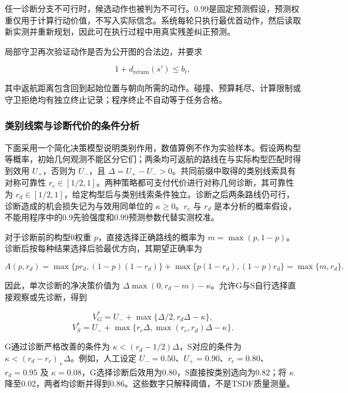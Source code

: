 \documentclass[11pt,a4paper]{article}
\numberwithin{equation}{section}
\begin{document}
任一诊断分支不可行时，候选动作也被判为不可行。0.99是固定预测假设，预测权重仅用于计算行动价值，不写入实际信念。系统每轮只执行最优首动作，然后读取新实测并重新规划，因此可在执行过程中用真实残差纠正预测。

局部守卫再次验证动作是否为公开图的合法边，并要求

\begin{equation}
1+d_{\mathrm{return}}(s')\le b_t,
\end{equation}

其中返航距离包含回到起始位置与朝向所需的动作。碰撞、预算耗尽、计算限制或守卫拒绝均有独立终止记录；程序终止不自动等于任务合格。

\hypertarget{ux7c7bux522bux7ebfux7d22ux4e0eux8bcaux65adux4ee3ux4ef7ux7684ux6761ux4ef6ux5206ux6790}{%
\subsubsection{类别线索与诊断代价的条件分析}\label{ux7c7bux522bux7ebfux7d22ux4e0eux8bcaux65adux4ee3ux4ef7ux7684ux6761ux4ef6ux5206ux6790}}

下面采用一个简化决策模型说明类别作用，数值算例不作为实验样本。假设两构型等概率，初始几何观测不能区分它们；两条均可返航的路线在与实际构型匹配时得到效用 \(U_+\)，否则为 \(U_-\)，且 \(\Delta=U_+-U_->0\)。共同前缀中取得的类别线索具有对称可靠性 \(r_c\in[1/2,1]\)。两种策略都可支付代价进行对称几何诊断，其可靠性为 \(r_d\in[1/2,1]\)，给定构型后与类别线索条件独立。诊断之后两条路线仍可行，诊断造成的机会损失记为与效用同单位的 \(\kappa\ge0\)。\(r_c\) 与 \(r_d\) 是本分析的概率假设，不能用程序中的0.9先验强度和0.99预测参数代替实测校准。

对于诊断前的构型0权重 \(p\)，直接选择正确路线的概率为 \(m=\max(p,1-p)\)。诊断后按每种结果选择后验最优方向，其期望正确率为

\begin{equation}
A(p,r_d)=\max\{pr_d,(1-p)(1-r_d)\}
+\max\{p(1-r_d),(1-p)r_d\}
=\max\{m,r_d\}.
\end{equation}

因此，单次诊断的净决策价值为 \(\Delta\max(0,r_d-m)-\kappa\)。允许G与S自行选择直接观察或先诊断，得到

\begin{equation}
V_G^*=U_-+\max\{\Delta/2,r_d\Delta-\kappa\},
\end{equation} \begin{equation}
V_S^*=U_-+\max\{r_c\Delta,\max(r_c,r_d)\Delta-\kappa\}.
\end{equation}

G通过诊断严格改善的条件为 \(\kappa<(r_d-1/2)\Delta\)，S对应的条件为 \(\kappa<(r_d-r_c)_+\Delta\)。例如，人工设定 \(U_-=0.50\)、\(U_+=0.90\)、\(r_c=0.80\)、\(r_d=0.95\) 及 \(\kappa=0.08\)，G选择诊断后效用为0.80，S直接按类别选向为0.82；将 \(\kappa\) 降至0.02，两者均诊断并得到0.86。这些数字只解释阈值，不是TSDF质量测量。
\end{document}
